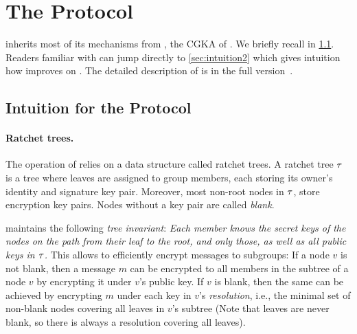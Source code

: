 
\section{The \saik Protocol}\label{sec:saik}
\saik inherits most of its mechanisms from \protITK, the CGKA of \mls. We briefly recall \protITK in
\cref{sec:intuition1}.
Readers familiar with \protITK can jump directly to \cref{sec:intuition2} which gives intuition how \saik improves on
\protITK. The detailed description of \saik is in the full version~\cite{EPRINT:AHKM21}.

\subsection{Intuition for the \protITK Protocol}\label{sec:intuition1}

\paragraph{Ratchet trees.}
The operation of \protITK relies on a data structure called ratchet trees. A ratchet tree $\tau$ is a tree where leaves are assigned to group members, each storing its owner's identity and signature key pair. Moreover, most non-root nodes in $\tau$, store encryption key pairs. Nodes without a key pair are called \emph{blank}.

\protITK maintains the following \emph{tree invariant}:
  {\it Each member knows the secret keys of the nodes on the path from their leaf to the root, and only those, as well as all public keys in $\tau$.}
This allows to efficiently encrypt messages to subgroups: If a node $v$ is not blank, then a message $m$ can be
encrypted to all members in the subtree of a node $v$ by encrypting it under $v$'s public key. If $v$ is blank, then the
same can be achieved by encrypting $m$ under each key in $v$'s \emph{resolution}, i.e., the minimal set of non-blank
nodes covering all leaves in $v$'s subtree (Note that leaves are never blank, so there is always a resolution covering
all leaves).

